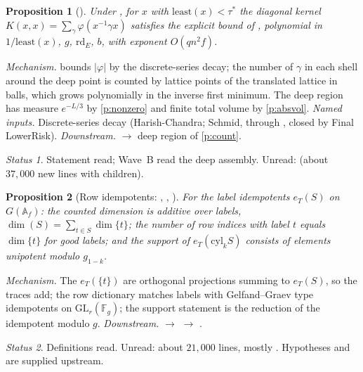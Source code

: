 \documentclass[11pt]{article}
\newcommand{\rd}{\mathrm{rd}}
\newtheorem{prop}{Proposition}
\theoremstyle{remark}
\newtheorem*{status}{Status}
\begin{document}
\begin{prop}[]\label{p:deep}
Under , for $x$ with $\mathrm{least}(x)<\tau^*$ the diagonal kernel $K(x,x)=\sum_\gamma\varphi(x^{-1}\gamma x)$ satisfies the explicit bound of , polynomial in $1/\mathrm{least}(x)$, $g$, $\rd_E$, $b$, with exponent $O(qn^2f)$.
\end{prop}
\emph{Mechanism.}  bounds $\lvert\varphi\rvert$ by the discrete-series decay; the number of $\gamma$ in each shell around the deep point is counted by lattice points of the translated lattice in balls, which grows polynomially in the inverse first minimum. The deep region has measure $e^{-L/3}$ by \ref{p:nonzero} and finite total volume by \ref{p:absvol}.
\emph{Named inputs.} Discrete-series decay (Harish-Chandra; Schmid, through , closed by Final LowerRisk).
\emph{Downstream.}  $\to$ deep region of \ref{p:count}.
\begin{status}Statement read; Wave~B read the deep assembly. Unread:  (about $37{,}000$ new lines with children).\end{status}

\begin{prop}[Row idempotents: , , ]\label{p:rows}
For the label idempotents $e_T(S)$ on $G(\mathbb A_f)$: the counted dimension is additive over labels, $\dim(S)=\sum_{t\in S}\dim\{t\}$; the number of row indices with label $t$ equals $\dim\{t\}$ for good labels; and the support of $e_T(\mathrm{cyl}_k S)$ consists of elements unipotent modulo $g_{1-k}$.
\end{prop}
\emph{Mechanism.} The $e_T(\{t\})$ are orthogonal projections summing to $e_T(S)$, so the traces add; the row dictionary matches labels with Gelfand--Graev type idempotents on $\mathrm{GL}_r(\mathbb F_g)$; the support statement is the reduction of the idempotent modulo $g$.
\emph{Downstream.}  $\to$  $\to$ .
\begin{status}Definitions read. Unread: about $21{,}000$ lines, mostly . Hypotheses  and  are supplied upstream.\end{status}
\end{document}
